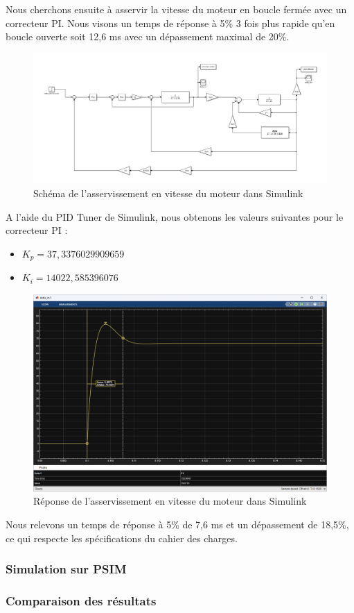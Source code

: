 Nous cherchons ensuite à asservir la vitesse du moteur en boucle fermée avec un correcteur PI. Nous visons un temps de réponse à 5\% 3 fois plus rapide qu'en boucle ouverte soit 12,6 ms avec un dépassement maximal de 20\%.
\begin{figure}[H]
    \centering
    \includegraphics[width=1\textwidth]{images/asserv_de_vitesse_tachy/Simulink_boucle_de_courant_vitesse.png}
    \caption{Schéma de l'asservissement en vitesse du moteur dans Simulink}
    \label{fig:asservissement_vitesse_simulink_schema}
\end{figure}
A l'aide du PID Tuner de Simulink, nous obtenons les valeurs suivantes pour le correcteur PI :
\begin{itemize}
    \item $K_p = 37,3376029909659$
    \item $K_i = 14022,585396076$
\end{itemize}
\begin{figure}[H]
    \centering
    \includegraphics[width=1\textwidth]{images/asserv_de_vitesse_tachy/Vitesse_tr5_BF.png}
    \caption{Réponse de l'asservissement en vitesse du moteur dans Simulink}
    \label{fig:reponse_asservissement_vitesse_simulink}
\end{figure}
Nous relevons un temps de réponse à 5\% de 7,6 ms et un dépassement de 18,5\%, ce qui respecte les spécifications du cahier des charges.

\subsubsection{Simulation sur PSIM}

\subsubsection{Comparaison des résultats}
